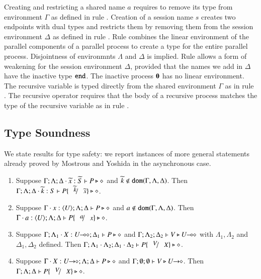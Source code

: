 Creating and restricting a
 shared name $a$ requires to remove
its type from environment $\Gamma$ as defined in 
rule . 
Creation of a session name $s$
creates two endpoints with dual types and restricts
them by removing them from the session environment
$\Delta$ as defined in rule . Rule
 combines the linear environment of
the parallel components of a parallel process
to create a type for the entire parallel process.
Disjointness of environmnts $\Lambda$ and $\Delta$
is implied. Rule  allows a form of weakening 
for the session environment $\Delta$, provided that
the names we add in $\Delta$ have the inactive
type $\mathtt{end}$. The inactive process $\mathbf{0}$ has no
linear environment. The recursive variable is typed
directly from the shared environment $\Gamma$ as
in rule .
The recursive operator requires that the body of
a recursive process matches the type of the recursive
variable as in rule . 



\subsection{Type Soundness}
We state results for type safety:
we report instances of more general statements already proved by
Mostrous and Yoshida in the asynchronous case.

\begin{lemma}\rm
	\label{lem:subst}
	\begin{enumerate}[1.]
		\item	Suppose $\Gamma; \Lambda; \Delta \cdot \widetilde{x}:\widetilde{S}  \vdash P \triangleright \diamond$ and
			$\widetilde{k} \not\in \mathtt{dom}(\Gamma, \Lambda, \Delta)$. 
			Then $\Gamma; \Lambda; \Delta \cat \widetilde{k}:S  \vdash P\subst{\widetilde{k}}{\widetilde{x}} \hastype \Proc$.

		\item	Suppose $\Gamma \cdot x:\langle U \rangle; \Lambda; \Delta \vdash P \triangleright \diamond$ and
			$a \notin \mathtt{dom}(\Gamma, \Lambda, \Delta)$. 
			Then $\Gamma \cat a:\chtype{U}; \Lambda; \Delta   \vdash P\subst{a}{x} \hastype \Proc$.

		\item	Suppose $\Gamma; \Lambda_1 \cdot X:U\!\! \multimap\!\! \diamond; \Delta_1  \vdash P \triangleright \diamond$ 
			and $\Gamma; \Lambda_2; \Delta_2  \vdash V \triangleright U\!\! \multimap\!\! \diamond$ with 
			$\Lambda_1, \Lambda_2$ and $\Delta_1, \Delta_2$ defined.  
			Then $\Gamma; \Lambda_1 \cat \Lambda_2; \Delta_1 \cat \Delta_2  \proves P\subst{V}{X} \hastype \Proc$.

		\item	Suppose $\Gamma \cdot X:U\!\! \rightarrow\!\! \diamond; \Lambda; \Delta  \vdash P \triangleright \diamond$ and
			$\Gamma; \emptyset ; \emptyset  \vdash V \triangleright U\!\! \rightarrow\!\! \diamond$.
			Then $\Gamma; \Lambda; \Delta  \proves P\subst{V}{X} \hastype \Proc$.
		\end{enumerate}
\end{lemma}

